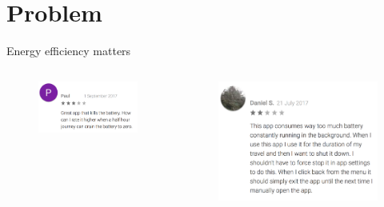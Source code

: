 \section{Problem}
\begin{frame}{Energy efficiency matters}
\begin{columns}
\begin{column}{0.5\textwidth}
\begin{figure}
        \includegraphics[width=\textwidth]{figures/angry_feedback_1.png}
\end{figure}
\end{column}
\begin{column}{0.5\textwidth}
\begin{figure}
        \includegraphics[width=\textwidth]{figures/angry_feedback_2.png}
\end{figure}
\end{column}
\end{columns}
\end{frame}
%
%
